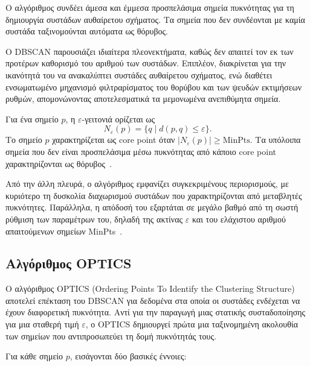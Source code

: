 Ο αλγόριθμος συνδέει άμεσα και έμμεσα προσπελάσιμα σημεία πυκνότητας για τη δημιουργία συστάδων αυθαίρετου σχήματος. Τα σημεία που δεν συνδέονται με καμία συστάδα ταξινομούνται αυτόματα ως θόρυβος.

Ο DBSCAN παρουσιάζει ιδιαίτερα πλεονεκτήματα, καθώς δεν απαιτεί τον εκ των προτέρων καθορισμό του αριθμού των συστάδων. Επιπλέον, διακρίνεται για την ικανότητά του να ανακαλύπτει συστάδες αυθαίρετου σχήματος, ενώ διαθέτει ενσωματωμένο μηχανισμό φιλτραρίσματος του θορύβου και των ψευδών εκτιμήσεων ρυθμών, απομονώνοντας αποτελεσματικά τα μεμονωμένα ανεπιθύμητα σημεία.

Για ένα σημείο $p$, η $\varepsilon$-γειτονιά ορίζεται ως
\begin{equation}
N_{\varepsilon}(p)=\{q\mid d(p,q)\leq\varepsilon\}.
\label{eq:dbscan-neighborhood}
\end{equation}
Το σημείο $p$ χαρακτηρίζεται ως core point όταν $|N_{\varepsilon}(p)|\geq\mathrm{MinPts}$. Τα υπόλοιπα σημεία που δεν είναι προσπελάσιμα μέσω πυκνότητας από κάποιο core point χαρακτηρίζονται ως θόρυβος~\cite{dbscan1996,schubert2017dbscan}.

Από την άλλη πλευρά, ο αλγόριθμος εμφανίζει συγκεκριμένους περιορισμούς, με κυριότερο τη δυσκολία διαχωρισμού συστάδων που χαρακτηρίζονται από μεταβλητές πυκνότητες. Παράλληλα, η απόδοσή του εξαρτάται σε μεγάλο βαθμό από τη σωστή ρύθμιση των παραμέτρων του, δηλαδή της ακτίνας $\varepsilon$ και του ελάχιστου αριθμού απαιτούμενων σημείων MinPts~\cite{dbscan1996}.

\subsection{Αλγόριθμος OPTICS}

Ο αλγόριθμος OPTICS (Ordering Points To Identify the Clustering Structure) αποτελεί επέκταση του DBSCAN για δεδομένα στα οποία οι συστάδες ενδέχεται να έχουν διαφορετική πυκνότητα. Αντί για την παραγωγή μιας στατικής συσταδοποίησης για μια σταθερή τιμή $\varepsilon$, ο OPTICS δημιουργεί πρώτα μια ταξινομημένη ακολουθία των σημείων που αντιπροσωπεύει τη δομή πυκνότητάς τους.

Για κάθε σημείο $p$, εισάγονται δύο βασικές έννοιες:

